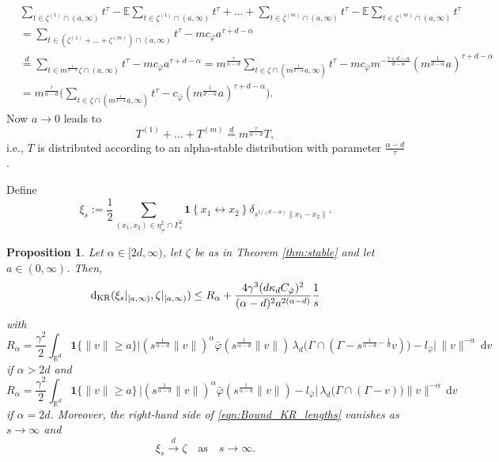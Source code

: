 \documentclass{article}
\newtheorem{prop}[theorem]{Proposition}
\theoremstyle{definition}
\numberwithin{equation}{section}
\theoremstyle{remark}
\newcommand{\R}{\mathbb{R}}
\begin{document}
\begin{align*}
& \sum_{t\in \zeta^{(1)}\cap(a,\infty)} t^\tau - \mathbb{E} \sum_{t\in \zeta^{(1)}\cap(a,\infty)} t^\tau + \ldots + \sum_{t\in \zeta^{(m)}\cap(a,\infty)} t^\tau - \mathbb{E}\sum_{t\in \zeta^{(m)}\cap(a,\infty)} t^\tau \\
& = \sum_{t\in (\zeta^{(1)}+\ldots+\zeta^{(m)})\cap(a,\infty)} t^\tau - m c_{\bar\varphi} a^{\tau+d-\alpha}\\
& \overset{d}{=} \sum_{t\in m^{\frac{1}{\alpha-d}}\zeta\cap (a,\infty)} t^\tau - m c_{\bar\varphi} a^{\tau+d-\alpha} = m^{\frac{\tau}{\alpha-d}} \sum_{t\in \zeta\cap (m^{\frac{1}{d-\alpha}}a,\infty)} t^\tau - m c_{\bar\varphi} m^{-\frac{\tau+d-\alpha}{d-\alpha}} (m^{\frac{1}{d-\alpha}}a)^{\tau+d-\alpha} \\
& = m^{\frac{\tau}{\alpha-d}} \bigg(\sum_{t\in \zeta\cap (m^{\frac{1}{d-\alpha}}a,\infty)} t^\tau - c_{\bar\varphi} (m^{\frac{1}{d-\alpha}}a)^{\tau+d-\alpha} \bigg).
\end{align*}
Now $a\to0$ leads to
$$
T^{(1)}+\ldots+T^{(m)} \overset{d}{=} m^{\frac{\tau}{\alpha-d}}  T, 
$$
i.e., $T$ is distributed according to an alpha-stable distribution with parameter $\frac{\alpha-d}{\tau}$.

Define
$$
\xi_s:=\frac{1}{2}\sum_{(x_1,x_2)\in\eta^2_{\neq}\cap \Gamma_s^2} \mathbf{1}\left\{ x_1 \leftrightarrow x_2 \right\}\delta_{s^{1/(d-\alpha)}\|x_1-x_2\|}.
$$

\begin{prop}\label{prop:convergence_point_process_edge_lengths}
Let $\alpha\in[2d,\infty)$, let $\zeta$ be as in Theorem \ref{thm:stable} and let $a\in(0,\infty)$. Then,
\begin{equation}\label{eqn:Bound_KR_lengths}
\mathrm{d}_{\rm KR}(\xi_s|_{[a,\infty)},\zeta|_{[a,\infty)}) \leq R_\alpha + \frac{4\gamma^3 (d\kappa_d C_{\bar{\varphi}})^2}{(\alpha-d)^2 a^{2(\alpha-d)}} \frac{1}{s}
\end{equation}
with
$$
R_\alpha = \frac{\gamma^2}{2}  \int_{\mathbb{R}^d} \mathbf{1}\Big\{\|v\|\geq a\Big\} \big| (s^{\frac{1}{\alpha-d}}\|v\|)^\alpha
\bar\varphi(s^{\frac{1}{\alpha-d}}\|v\|)\,
\lambda_d\big(\Gamma\cap(\Gamma-s^{\frac{1}{\alpha-d}-\frac{1}{d}}v)\big) - l_{\bar{\varphi}}\big| \, \|v\|^{-\alpha}\,\mathrm{d}v
$$
if $\alpha>2d$ and
$$
R_\alpha = \frac{\gamma^2}{2} \int_{\R^d}
\mathbf{1}\Big\{\|v\|\geq a\Big\}\, \big|(s^{\frac{1}{\alpha-d}}\|v\|)^\alpha
\bar\varphi(s^{\frac{1}{\alpha-d}}\|v\|) - l_{\bar{\varphi}}\big|\,
\lambda_d\big(\Gamma\cap(\Gamma-v)\big) \|v\|^{-\alpha}\,\mathrm{d}v
$$
if $\alpha=2d$. Moreover, the right-hand side of \eqref{eqn:Bound_KR_lengths} vanishes as $s\to\infty$ and
$$
\xi_s\overset{d}{\longrightarrow} \zeta \quad \text{as} \quad s\to\infty.
$$
\end{prop}
\end{document}
